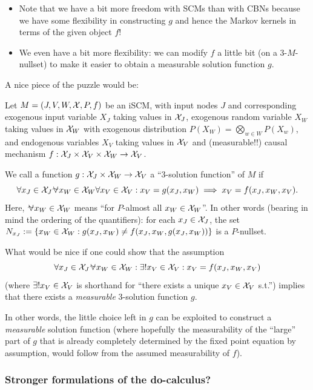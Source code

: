 \begin{itemize}
  \item Note that we have a bit more freedom with SCMs than with CBNs because we have some flexibility in constructing $g$ and hence the Markov kernels in terms of the given object $f$!
  \item We even have a bit more flexibility: we can modify $f$ a little bit (on a 3-$M$-nullset) to make it easier to obtain a measurable solution function $g$.
\end{itemize}

\clearpage
A nice piece of the puzzle would be:
\begin{Con}
  Let $M = \left ( J, V, W, \mathcal{X}, P, f \right )$ be an iSCM, with input nodes $J$ and corresponding exogenous input variable $X_J$ taking values in $\mathcal{X}_J$,
  exogenous random variable $X_W$ taking values in $\mathcal{X}_W$ with exogenous distribution $P(X_W) = \bigotimes_{w \in W} P(X_w)$,
  and endogenous variables $X_V$ taking values in $\mathcal{X}_V$ and (measurable!!) causal mechanism $f : \mathcal{X}_J \times \mathcal{X}_V \times \mathcal{X}_W \to \mathcal{X}_V$.

  We call a function $g : \mathcal{X}_J \times \mathcal{X}_W \to \mathcal{X}_V$ a ``3-solution function'' of $M$ if
    $$ \forall x_J\in \CX_J \foralmostall x_W \in \CX_W \forall x_V \in \CX_V: x_V=g(x_J,x_W) \implies x_V=f(x_J,x_W,x_V).$$
  Here, $\foralmostall x_W \in \CX_W$ means ``for $P$-almost all $x_W \in \mathcal{X}_W$''.
  In other words (bearing in mind the ordering of the quantifiers):
  for each $x_J \in \mathcal{X}_J$, the set $N_{x_J} := \{x_W \in \mathcal{X}_W : g(x_J,x_W) \ne f(x_J,x_W,g(x_J,x_W))\}$ is a $P$-nullset.

  What would be nice if one could show that the assumption 
    $$ \forall x_J\in \CX_J \foralmostall x_W \in \CX_W : \exists! x_V \in \CX_V: x_V=f(x_J,x_W,x_V)$$
  (where $\exists! x_V \in \mathcal{X}_V$ is shorthand for ``there exists a unique $x_V \in \mathcal{X}_V$ s.t.'')
  implies that there exists a \emph{measurable} 3-solution function $g$.

  In other words, the little choice left in $g$ can be exploited to construct a \emph{measurable} solution function
  (where hopefully the measurability of the ``large'' part of $g$ that is already completely determined by the fixed point equation by assumption, would follow from the assumed measurability of $f$).
\end{Con}

\subsubsection{Stronger formulations of the do-calculus?}

